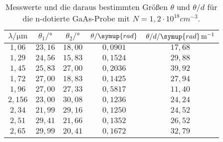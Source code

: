 \begin{table}[hbt!]
  \centering
  \caption{Messwerte und die daraus bestimmten Größen $\theta$ und $\theta/d$ für die n-dotierte GaAs-Probe
  mit $N=1,2 \cdot 10^{18} \si{cm}^{-3}$.}
  \label{tab:m2}
  \begin{tabular}{c c c c c}
    \toprule
    $\lambda/\si{\micro\meter}$ & $\theta_{1}/\si{\degree}$ & $\theta_{2}/\si{\degree}$ & $\theta/\symup{rad}$ & $\theta/d/\symup{rad}\, \si{m}^{-1}$\\
    \midrule
    $1,06 $ & $23,16$ & $18,00$ & $0,0901$ & $17,68$ \\
    $1,29 $ & $24,56$ & $15,83$ & $0,1524$ & $29,88$ \\
    $1,45 $ & $25,83$ & $27,00$ & $0,2036$ & $39,92$ \\
    $1,72 $ & $27,00$ & $18,83$ & $0,1425$ & $27,94$ \\
    $1,96 $ & $27,00$ & $27,33$ & $0,5817$ & $11,40$ \\
    $2,156$ & $23,00$ & $30,08$ & $0,1236$ & $24,24$ \\
    $2,34 $ & $21,99$ & $29,16$ & $0,1250$ & $24,52$ \\
    $2,51 $ & $29,41$ & $21,66$ & $0,1352$ & $26,52$ \\
    $2,65 $ & $29,99$ & $20,41$ & $0,1672$ & $32,79$ \\
    \bottomrule
  \end{tabular}
\end{table}

